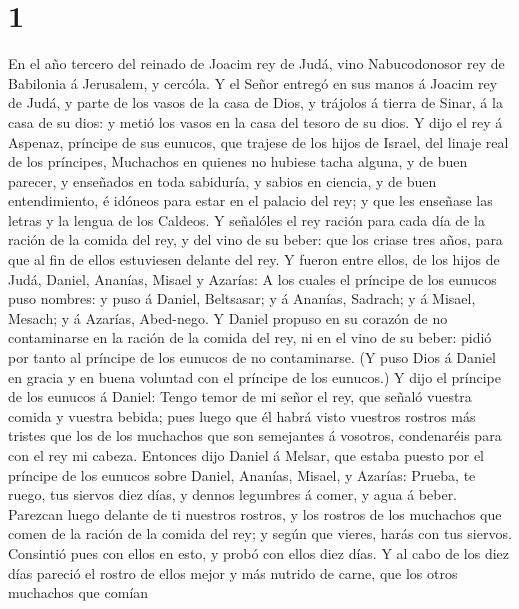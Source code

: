 \hypertarget{section}{%
\section{1}\label{section}}

 En el año tercero del reinado de Joacim rey de Judá, vino
Nabucodonosor rey de Babilonia á Jerusalem, y cercóla.  Y el
Señor entregó en sus manos á Joacim rey de Judá, y parte de los vasos de
la casa de Dios, y trájolos á tierra de Sinar, á la casa de su dios: y
metió los vasos en la casa del tesoro de su dios.  Y dijo el
rey á Aspenaz, príncipe de sus eunucos, que trajese de los hijos de
Israel, del linaje real de los príncipes,  Muchachos en
quienes no hubiese tacha alguna, y de buen parecer, y enseñados en toda
sabiduría, y sabios en ciencia, y de buen entendimiento, é idóneos para
estar en el palacio del rey; y que les enseñase las letras y la lengua
de los Caldeos.  Y señalóles el rey ración para cada día de
la ración de la comida del rey, y del vino de su beber: que los criase
tres años, para que al fin de ellos estuviesen delante del rey.
 Y fueron entre ellos, de los hijos de Judá, Daniel,
Ananías, Misael y Azarías:  A los cuales el príncipe de los
eunucos puso nombres: y puso á Daniel, Beltsasar; y á Ananías, Sadrach;
y á Misael, Mesach; y á Azarías, Abed-nego.  Y Daniel
propuso en su corazón de no contaminarse en la ración de la comida del
rey, ni en el vino de su beber: pidió por tanto al príncipe de los
eunucos de no contaminarse.  (Y puso Dios á Daniel en gracia
y en buena voluntad con el príncipe de los eunucos.)  Y
dijo el príncipe de los eunucos á Daniel: Tengo temor de mi señor el
rey, que señaló vuestra comida y vuestra bebida; pues luego que él habrá
visto vuestros rostros más tristes que los de los muchachos que son
semejantes á vosotros, condenaréis para con el rey mi cabeza.
 Entonces dijo Daniel á Melsar, que estaba puesto por el
príncipe de los eunucos sobre Daniel, Ananías, Misael, y Azarías:
 Prueba, te ruego, tus siervos diez días, y dennos
legumbres á comer, y agua á beber.  Parezcan luego delante
de ti nuestros rostros, y los rostros de los muchachos que comen de la
ración de la comida del rey; y según que vieres, harás con tus siervos.
 Consintió pues con ellos en esto, y probó con ellos diez
días.  Y al cabo de los diez días pareció el rostro de
ellos mejor y más nutrido de carne, que los otros muchachos que comían
